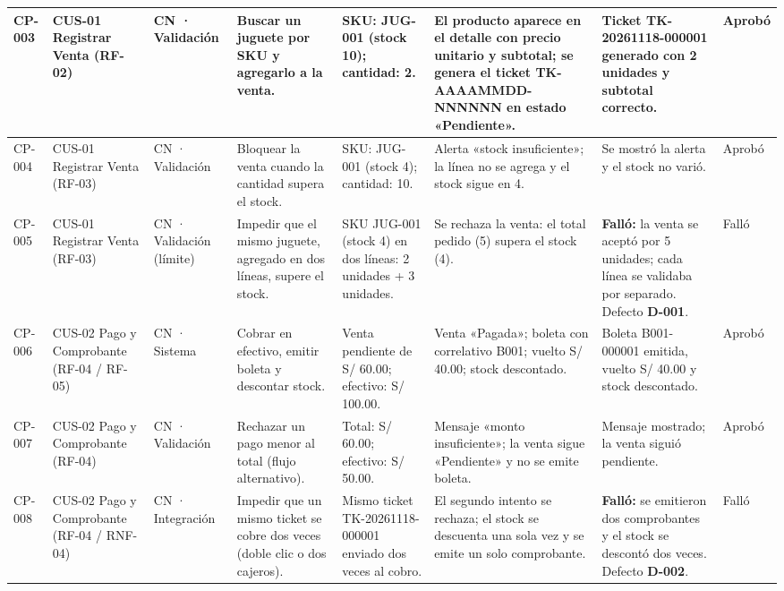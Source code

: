 \begin{landscape}
\begin{xltabular}{\linewidth}{|C{1.15cm}|L{2.35cm}|C{1.65cm}|L{3.55cm}|L{3.0cm}|Y|Y|C{1.3cm}|}
  CP-003 & CUS-01 Registrar Venta (RF-02) & CN · Validación & Buscar un juguete por SKU y agregarlo a la venta. & SKU: JUG-001 (stock 10); cantidad: 2. & El producto aparece en el detalle con precio unitario y subtotal; se genera el ticket TK-AAAAMMDD-NNNNNN en estado «Pendiente». & Ticket TK-20261118-000001 generado con 2 unidades y subtotal correcto. & Aprobó \\ \hline

  CP-004 & CUS-01 Registrar Venta (RF-03) & CN · Validación & Bloquear la venta cuando la cantidad supera el stock. & SKU: JUG-001 (stock 4); cantidad: 10. & Alerta «stock insuficiente»; la línea no se agrega y el stock sigue en 4. & Se mostró la alerta y el stock no varió. & Aprobó \\ \hline

  CP-005 & CUS-01 Registrar Venta (RF-03) & CN · Validación (límite) & Impedir que el mismo juguete, agregado en dos líneas, supere el stock. & SKU JUG-001 (stock 4) en dos líneas: 2 unidades + 3 unidades. & Se rechaza la venta: el total pedido (5) supera el stock (4). & \textbf{Falló:} la venta se aceptó por 5 unidades; cada línea se validaba por separado. Defecto \textbf{D-001}. & Falló \\ \hline

  CP-006 & CUS-02 Pago y Comprobante (RF-04 / RF-05) & CN · Sistema & Cobrar en efectivo, emitir boleta y descontar stock. & Venta pendiente de S/ 60.00; efectivo: S/ 100.00. & Venta «Pagada»; boleta con correlativo B001; vuelto S/ 40.00; stock descontado. & Boleta B001-000001 emitida, vuelto S/ 40.00 y stock descontado. & Aprobó \\ \hline

  CP-007 & CUS-02 Pago y Comprobante (RF-04) & CN · Validación & Rechazar un pago menor al total (flujo alternativo). & Total: S/ 60.00; efectivo: S/ 50.00. & Mensaje «monto insuficiente»; la venta sigue «Pendiente» y no se emite boleta. & Mensaje mostrado; la venta siguió pendiente. & Aprobó \\ \hline

  CP-008 & CUS-02 Pago y Comprobante (RF-04 / RNF-04) & CN · Integración & Impedir que un mismo ticket se cobre dos veces (doble clic o dos cajeros). & Mismo ticket TK-20261118-000001 enviado dos veces al cobro. & El segundo intento se rechaza; el stock se descuenta una sola vez y se emite un solo comprobante. & \textbf{Falló:} se emitieron dos comprobantes y el stock se descontó dos veces. Defecto \textbf{D-002}. & Falló \\ \hline


\end{xltabular}
\end{landscape}
